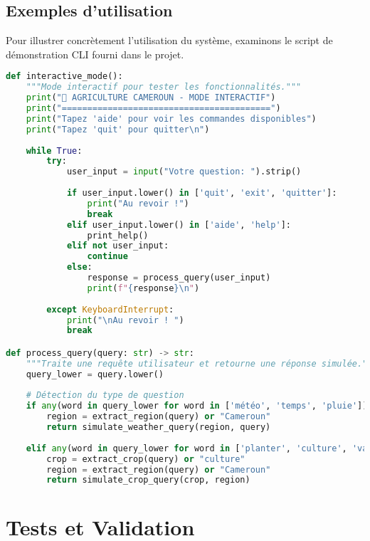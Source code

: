 \subsection{Exemples d'utilisation}

Pour illustrer concrètement l'utilisation du système, examinons le script de démonstration CLI fourni dans le projet.

\begin{lstlisting}[language=Python, caption=Interface CLI de démonstration (extrait de examples/demo\_cli.py)]
def interactive_mode():
    """Mode interactif pour tester les fonctionnalités."""
    print("🌱 AGRICULTURE CAMEROUN - MODE INTERACTIF")
    print("=========================================")
    print("Tapez 'aide' pour voir les commandes disponibles")
    print("Tapez 'quit' pour quitter\n")
    
    while True:
        try:
            user_input = input("Votre question: ").strip()
            
            if user_input.lower() in ['quit', 'exit', 'quitter']:
                print("Au revoir !")
                break
            elif user_input.lower() in ['aide', 'help']:
                print_help()
            elif not user_input:
                continue
            else:
                response = process_query(user_input)
                print(f"{response}\n")
                
        except KeyboardInterrupt:
            print("\nAu revoir ! ")
            break

def process_query(query: str) -> str:
    """Traite une requête utilisateur et retourne une réponse simulée."""
    query_lower = query.lower()
    
    # Détection du type de question
    if any(word in query_lower for word in ['météo', 'temps', 'pluie']):
        region = extract_region(query) or "Cameroun"
        return simulate_weather_query(region, query)
    
    elif any(word in query_lower for word in ['planter', 'culture', 'variété']):
        crop = extract_crop(query) or "culture"
        region = extract_region(query) or "Cameroun"
        return simulate_crop_query(crop, region)
\end{lstlisting}

\section{Tests et Validation}

